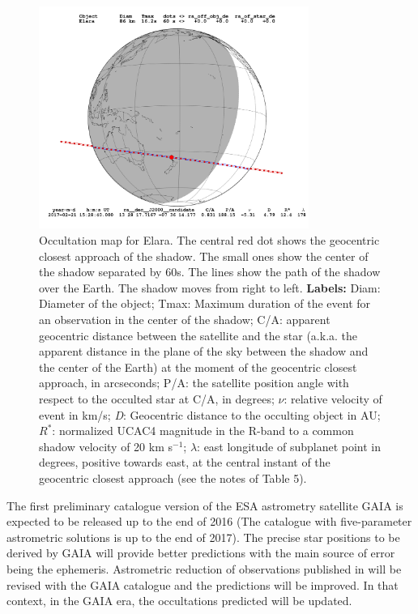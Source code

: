 \documentclass[useAMS,usenatbib]{mn2e}
\begin{document}
\begin{figure}
\begin{centering}
\includegraphics[width = 8.8cm]{figures/Elara_2017-02-21T15:28:40.png}   
\caption{Occultation map for Elara. The central red dot shows the geocentric closest approach of the shadow. The small ones show the center of the shadow separated by 60s. The lines show the path of the shadow over the Earth. The shadow moves from right to left.
\textbf{Labels:} Diam: Diameter of the object; Tmax: Maximum duration of the event for an observation in the center of the shadow; C/A: apparent geocentric distance between the satellite and the star (a.k.a. the apparent distance in the plane of the sky between the shadow and the center of the Earth) at the moment of the geocentric closest approach, in arcseconds; P/A: the satellite position angle with respect to the occulted star at C/A, in degrees; $\nu$: relative velocity of event in km/s; {\it D}: Geocentric distance to the occulting object in AU; $R^*$: normalized UCAC4 magnitude in the R-band to a common shadow velocity of 20 km s$^{-1}$; $\lambda$: east longitude of subplanet point in degrees, positive towards east, at the central instant of the geocentric closest approach (see the notes of Table 5).}
\label{Fig: ocultacao}
\end{centering}
\end{figure}

The first preliminary catalogue version of the ESA astrometry satellite GAIA \citep{deBruijne2012} is expected to be released up to the end of 2016 (The catalogue with five-parameter astrometric solutions is up to the end of 2017). The precise star positions to be derived by GAIA will provide better predictions with the main source of error being the ephemeris. Astrometric reduction of observations published in  will be revised with the GAIA catalogue and the predictions will be improved. In that context, in the GAIA era, the occultations predicted will be updated.
\end{document}
